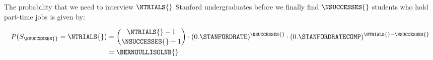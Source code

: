 The probability that we need to interview $\NTRIALS{}$ Stanford undergraduates before we finally find $\NSUCCESSES{}$ students who hold part-time jobs is given by:

\begin{equation*}
\begin{split}
P(S_{\NSUCCESSES{}} = \NTRIALS{}) &= \binom{\NTRIALS{} - 1}{\NSUCCESSES{} - 1} \cdot (0.\STANFORDRATE)^{\NSUCCESSES{}} \cdot (0.\STANFORDRATECOMP)^{\NTRIALS{} - \NSUCCESSES{}} \\
                                  &= \BERNOULLISOLNB{}
\end{split}
\end{equation*}
